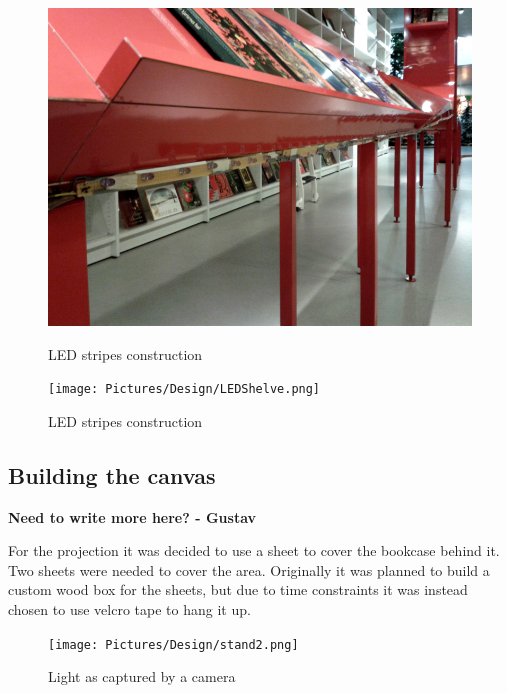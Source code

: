\begin{figure}[htbp] \centering
\begin{minipage}[b]{0.45\textwidth} \centering
\includegraphics[width=1.00\textwidth]{Pictures/Design/LEDRedShelve.png}
\caption{LED stripes construction}
\label{fig:RealRedLEDs}
\end{minipage} \hfill
\begin{minipage}[b]{0.45\textwidth} \centering
\texttt{[image: Pictures/Design/LEDShelve.png]} 
\caption{LED stripes construction}
\label{fig:RealLEDs}
\end{minipage} \hfill
\end{figure}

\subsection{Building the canvas}
\textbf{Need to write more here? - Gustav}


For the projection it was decided to use a sheet to cover the bookcase behind it. Two sheets were needed to cover the area. Originally it was planned to build a custom wood box for the sheets, but due to time constraints it was instead chosen to use velcro tape to hang it up.
\begin{figure}[htbp] 
\centering 
\texttt{[image: Pictures/Design/stand2.png]} 
\caption{Light as captured by a camera} 
\label{fig:CanvasPosition} 
\end{figure}

